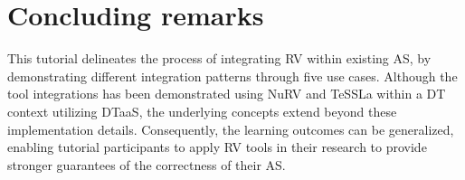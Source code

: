 \section{Concluding remarks} \label{sec:conclude}

This tutorial delineates the process of integrating RV within existing AS, by demonstrating different integration patterns through five use cases.
Although the tool integrations has been demonstrated using NuRV and TeSSLa within a DT context utilizing DTaaS, the underlying concepts extend beyond these implementation details.
Consequently, the learning outcomes can be generalized, enabling tutorial participants to apply RV tools in their research to provide stronger guarantees of the correctness of their AS.
